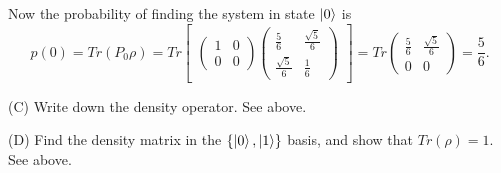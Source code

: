 \documentclass[10pt]{article}
\begin{document}
Now the probability of finding the system in state $\ket{0}$ is
\[
p(0) = Tr(P_0 \rho) = Tr \begin{bmatrix}
\begin{pmatrix}
1 & 0 \\
0 & 0
\end{pmatrix}
\begin{pmatrix}
\frac{5}{6} & \frac{\sqrt{5}}{6} \\
\frac{\sqrt{5}}{6} & \frac{1}{6}
\end{pmatrix}
\end{bmatrix}
= Tr \begin{pmatrix}
\frac{5}{6} & \frac{\sqrt{5}}{6} \\
0 & 0
\end{pmatrix}
= \frac{5}{6}.
\]

(C) Write down the density operator. See above.

(D) Find the density matrix in the $\{ \ket{0}, \ket{1} \}$ basis, and show that $Tr(\rho) = 1$. See above.
\end{document}

